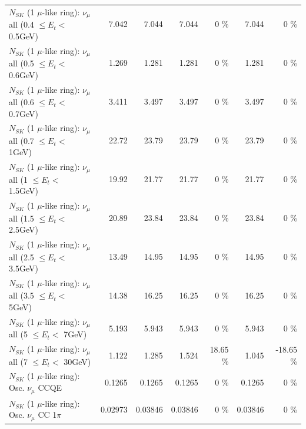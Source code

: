 \begin{table}
\begin{tabular}{| l | r | r | r  r | r  r |}
       $N_{SK}$ (1 $\mu$-like ring): $\nu_{\mu}$ all (0.4 $\leq E_{t} <$ 0.5GeV) &           7.042 &           7.044 &           7.044 &        0 \%  &           7.044 &        0 \%  \\ 
       $N_{SK}$ (1 $\mu$-like ring): $\nu_{\mu}$ all (0.5 $\leq E_{t} <$ 0.6GeV) &           1.269 &           1.281 &           1.281 &        0 \%  &           1.281 &        0 \%  \\ 
       $N_{SK}$ (1 $\mu$-like ring): $\nu_{\mu}$ all (0.6 $\leq E_{t} <$ 0.7GeV) &           3.411 &           3.497 &           3.497 &        0 \%  &           3.497 &        0 \%  \\ 
         $N_{SK}$ (1 $\mu$-like ring): $\nu_{\mu}$ all (0.7 $\leq E_{t} <$ 1GeV) &           22.72 &           23.79 &           23.79 &        0 \%  &           23.79 &        0 \%  \\ 
         $N_{SK}$ (1 $\mu$-like ring): $\nu_{\mu}$ all (1 $\leq E_{t} <$ 1.5GeV) &           19.92 &           21.77 &           21.77 &        0 \%  &           21.77 &        0 \%  \\ 
       $N_{SK}$ (1 $\mu$-like ring): $\nu_{\mu}$ all (1.5 $\leq E_{t} <$ 2.5GeV) &           20.89 &           23.84 &           23.84 &        0 \%  &           23.84 &        0 \%  \\ 
       $N_{SK}$ (1 $\mu$-like ring): $\nu_{\mu}$ all (2.5 $\leq E_{t} <$ 3.5GeV) &           13.49 &           14.95 &           14.95 &        0 \%  &           14.95 &        0 \%  \\ 
         $N_{SK}$ (1 $\mu$-like ring): $\nu_{\mu}$ all (3.5 $\leq E_{t} <$ 5GeV) &           14.38 &           16.25 &           16.25 &        0 \%  &           16.25 &        0 \%  \\ 
           $N_{SK}$ (1 $\mu$-like ring): $\nu_{\mu}$ all (5 $\leq E_{t} <$ 7GeV) &           5.193 &           5.943 &           5.943 &        0 \%  &           5.943 &        0 \%  \\ 
          $N_{SK}$ (1 $\mu$-like ring): $\nu_{\mu}$ all (7 $\leq E_{t} <$ 30GeV) &           1.122 &           1.285 &           1.524 &    18.65 \%  &           1.045 &   -18.65 \%  \\ 
\hline
\hline
                               $N_{SK}$ (1 $\mu$-like ring): Osc. $\nu_\mu$ CCQE &          0.1265 &          0.1265 &          0.1265 &        0 \%  &          0.1265 &        0 \%  \\ 
                          $N_{SK}$ (1 $\mu$-like ring): Osc. $\nu_\mu$ CC 1$\pi$ &         0.02973 &         0.03846 &         0.03846 &        0 \%  &         0.03846 &        0 \%  \\ 

\end{tabular}
\end{table}
